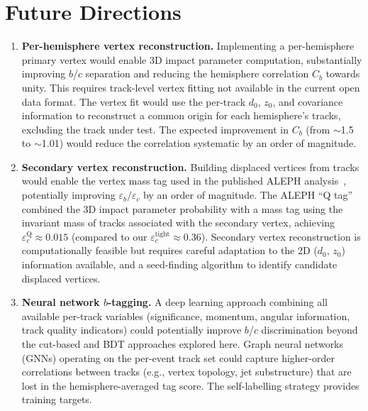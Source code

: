 \documentclass[11pt,a4paper]{article}
\begin{document}
\section{Future Directions}
\label{sec:future}

\begin{enumerate}
\item \textbf{Per-hemisphere vertex reconstruction.}
  Implementing a per-hemisphere primary vertex would enable
  3D impact parameter computation, substantially improving
  $b$/$c$ separation and reducing the hemisphere correlation
  $C_b$ towards unity.
  This requires track-level vertex fitting not available in the
  current open data format.
  The vertex fit would use the per-track $d_0$, $z_0$, and
  covariance information to reconstruct a common origin for
  each hemisphere's tracks, excluding the track under test.
  The expected improvement in $C_b$ (from $\sim$1.5 to $\sim$1.01)
  would reduce the correlation systematic by an order of magnitude.

\item \textbf{Secondary vertex reconstruction.}
  Building displaced vertices from tracks would enable the
  vertex mass tag used in the published ALEPH
  analysis~\cite{ALEPH:Rb:1996}, potentially improving
  $\varepsilon_b/\varepsilon_c$ by an order of magnitude.
  The ALEPH ``Q tag'' combined the 3D impact parameter probability
  with a mass tag using the invariant mass of tracks associated
  with the secondary vertex, achieving $\varepsilon_c^\text{Q}
  \approx 0.015$ (compared to our $\varepsilon_c^\text{tight}
  \approx 0.36$).
  Secondary vertex reconstruction is computationally feasible
  but requires careful adaptation to the 2D ($d_0$, $z_0$)
  information available, and a seed-finding algorithm to identify
  candidate displaced vertices.

\item \textbf{Neural network $b$-tagging.}
  A deep learning approach combining all available per-track
  variables (significance, momentum, angular information, track
  quality indicators) could potentially improve $b$/$c$
  discrimination beyond the cut-based and BDT approaches explored
  here.
  Graph neural networks (GNNs) operating on the per-event track
  set could capture higher-order correlations between tracks
  (e.g., vertex topology, jet substructure) that are lost in the
  hemisphere-averaged tag score.
  The self-labelling strategy provides training targets.


\end{enumerate}
\end{document}
